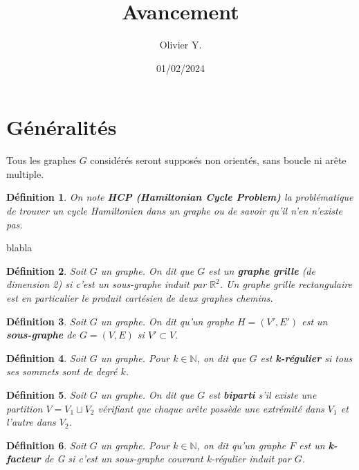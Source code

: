 \documentclass{article}
\title{Avancement}
\author{Olivier Y.}
\date{01/02/2024}
\newtheorem{definition}{Définition}[section]
\begin{document}
\maketitle

\tableofcontents
\newpage






\section{Généralités}

Tous les graphes $G$ considérés seront supposés non orientés, sans boucle ni arête multiple.

\begin{definition}
On note \textbf{HCP (Hamiltonian Cycle Problem)} la problématique de trouver un cycle Hamiltonien dans un graphe ou de savoir qu'il n'en n'existe pas.
\end{definition}

blabla

\begin{definition}
Soit $G$ un graphe.
On dit que $G$ est un \textbf{graphe grille} (de dimension 2) si c'est un sous-graphe induit par $\mathbb{R}^{2}$.
Un graphe grille rectangulaire est en particulier le produit cartésien de deux graphes chemins.
\end{definition}

\begin{definition}
Soit $G$ un graphe.
On dit qu'un graphe $H=(V',E')$ est un \textbf{sous-graphe} de $G=(V,E)$ si $V' \subset V$.
\end{definition}

\begin{definition}
Soit $G$ un graphe.
Pour $k \in \mathbb{N}$, on dit que $G$ est \textbf{k-régulier} si tous ses sommets sont de degré $k$.
\end{definition}

\begin{definition}
Soit $G$ un graphe.
On dit que $G$ est \textbf{biparti} s'il existe une partition $V=V_{1} \sqcup V_{2}$ vérifiant que chaque arête possède une extrémité dans $V_{1}$ et l'autre dans $V_{2}$.
\end{definition}

\begin{definition}
Soit $G$ un graphe.
Pour $k \in \mathbb{N}$, on dit qu'un graphe $F$ est un \textbf{k-facteur} de G si c'est un sous-graphe couvrant k-régulier induit par $G$.
\end{definition}
\end{document}
